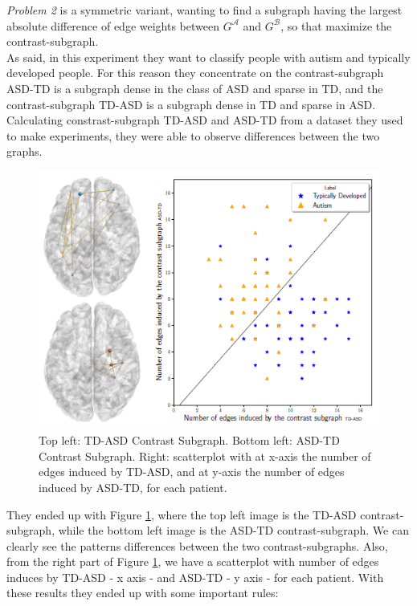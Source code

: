 \textit{Problem 2} is a symmetric variant, wanting to find a subgraph having the largest absolute difference of edge weights between $G^{\mathcal{A}}$ and $G^{\mathcal{B}}$, so that maximize the contrast-subgraph. 
\\

As said, in this experiment they want to classify people with autism and typically developed people. For this reason they concentrate on the contrast-subgraph ASD-TD is a subgraph dense in the class of ASD and sparse in TD, and the contrast-subgraph TD-ASD is a subgraph dense in TD and sparse in ASD. Calculating constrast-subgraph TD-ASD and ASD-TD from a dataset they used to make experiments, they were able to observe differences between the two graphs.
\begin{figure}[htbp]
	\centering
	\includegraphics[scale=0.8]{Immagini/c-s1.PNG}
	\caption{Top left: TD-ASD Contrast Subgraph. Bottom left: ASD-TD Contrast Subgraph. Right: scatterplot with at x-axis the number of edges induced by TD-ASD, and at y-axis the number of edges induced by ASD-TD, for each patient.}
	\label{fig:diagram6}
\end{figure}
They ended up with Figure \ref{fig:diagram6}, where the top left image is the TD-ASD contrast-subgraph, while the bottom left image is the ASD-TD contrast-subgraph. We can clearly see the patterns differences between the two contrast-subgraphs. Also, from the right part of Figure \ref{fig:diagram6}, we have a scatterplot with number of edges induces by TD-ASD - x axis - and ASD-TD - y axis - for each patient. With these results they ended up with some important rules:
